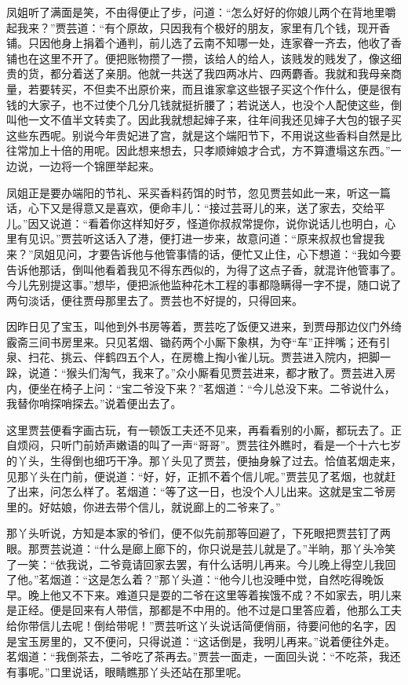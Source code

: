 \documentclass[12pt,oneside]{book}
\begin{document}
凤姐听了满面是笑，不由得便止了步，问道：“怎么好好的你娘儿两个在背地里嚼起我来？”贾芸道：“有个原故，只因我有个极好的朋友，家里有几个钱，现开香铺。只因他身上捐着个通判，前儿选了云南不知哪一处，连家眷一齐去，他收了香铺也在这里不开了。便把账物攒了一攒，该给人的给人，该贱发的贱发了，像这细贵的货，都分着送了亲朋。他就一共送了我四两冰片、四两麝香。我就和我母亲商量，若要转买，不但卖不出原价来，而且谁家拿这些银子买这个作什么，便是很有钱的大家子，也不过使个几分几钱就挺折腰了；若说送人，也没个人配使这些，倒叫他一文不值半文转卖了。因此我就想起婶子来，往年间我还见婶子大包的银子买这些东西呢。别说今年贵妃进了宫，就是这个端阳节下，不用说这些香料自然是比往常加上十倍的用呢。因此想来想去，只孝顺婶娘才合式，方不算遭塌这东西。”一边说，一边将一个锦匣举起来。

凤姐正是要办端阳的节礼、采买香料药饵的时节，忽见贾芸如此一来，听这一篇话，心下又是得意又是喜欢，便命丰儿：“接过芸哥儿的来，送了家去，交给平儿。”因又说道：“看着你这样知好歹，怪道你叔叔常提你，说你说话儿也明白，心里有见识。”贾芸听这话入了港，便打进一步来，故意问道：“原来叔叔也曾提我来？”凤姐见问，才要告诉他与他管事情的话，便忙又止住，心下想道：“我如今要告诉他那话，倒叫他看着我见不得东西似的，为得了这点子香，就混许他管事了。今儿先别提这事。”想毕，便把派他监种花木工程的事都隐瞒得一字不提，随口说了两句淡话，便往贾母那里去了。贾芸也不好提的，只得回来。

因昨日见了宝玉，叫他到外书房等着，贾芸吃了饭便又进来，到贾母那边仪门外绮霰斋三间书房里来。只见茗烟、锄药两个小厮下象棋，为夺“车”正拌嘴；还有引泉、扫花、挑云、伴鹤四五个人，在房檐上掏小雀儿玩。贾芸进入院内，把脚一跺，说道：“猴头们淘气，我来了。”众小厮看见贾芸进来，都才散了。贾芸进入房内，便坐在椅子上问：“宝二爷没下来？”茗烟道：“今儿总没下来。二爷说什么，我替你哨探哨探去。”说着便出去了。

这里贾芸便看字画古玩，有一顿饭工夫还不见来，再看看别的小厮，都玩去了。正自烦闷，只听门前娇声嫩语的叫了一声“哥哥”。贾芸往外瞧时，看是一个十六七岁的丫头，生得倒也细巧干净。那丫头见了贾芸，便抽身躲了过去。恰值茗烟走来，见那丫头在门前，便说道：“好，好，正抓不着个信儿呢。”贾芸见了茗烟，也就赶了出来，问怎么样了。茗烟道：“等了这一日，也没个人儿出来。这就是宝二爷房里的。好姑娘，你进去带个信儿，就说廊上的二爷来了。”

那丫头听说，方知是本家的爷们，便不似先前那等回避了，下死眼把贾芸钉了两眼。那贾芸说道：“什么是廊上廊下的，你只说是芸儿就是了。”半晌，那丫头冷笑了一笑：“依我说，二爷竟请回家去罢，有什么话明儿再来。今儿晚上得空儿我回了他。”茗烟道：“这是怎么着？”那丫头道：“他今儿也没睡中觉，自然吃得晚饭早。晚上他又不下来。难道只是耍的二爷在这里等着挨饿不成？不如家去，明儿来是正经。便是回来有人带信，那都是不中用的。他不过是口里答应着，他那么工夫给你带信儿去呢！倒给带呢！”贾芸听这丫头说话简便俏丽，待要问他的名字，因是宝玉房里的，又不便问，只得说道：“这话倒是，我明儿再来。”说着便往外走。茗烟道：“我倒茶去，二爷吃了茶再去。”贾芸一面走，一面回头说：“不吃茶，我还有事呢。”口里说话，眼睛瞧那丫头还站在那里呢。
\end{document}
